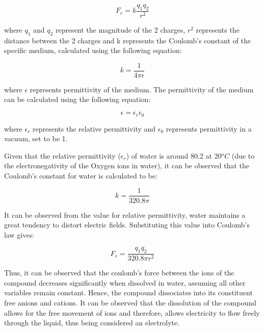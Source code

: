 \documentclass[11pt, a4]{article}
\begin{document}
			\begin{equation}
				F_{e} = k \frac{q_{1}q_{2}}{r^{2}}
			\end{equation}
				
				where $q_{1}$ and $q_{2}$ represent the magnitude of the 2 charges, $r^{2}$ represents the distance between the 2 charges and k represents the Coulomb's constant of the specific medium, calculated using the following equation:
				
			\begin{equation}
				k = \frac{1}{4 \pi \epsilon}
			\end{equation}
			
			where $\epsilon$ represents permittivity of the medium. The permittivity of the medium can be calculated using the following equation:
			
			\begin{equation}
				\epsilon = \epsilon _{r}\epsilon_{0}
			\end{equation}
			
			where $\epsilon _{r}$ represents the relative permittivity and $\epsilon _{0}$ represents permittivity in a vacuum, set to be 1.
			
			\bigbreak
			
			Given that the relative permittivity ($\epsilon _{r}$) of water is around 80.2 at 20$^{o}C$ (due to the electronegativity of the Oxygen ions in water), it can be observed that the Coulomb's constant for water is calculated to be:
			
			\begin{equation*}
				k = \frac{1}{320.8\pi}
			\end{equation*}
			
			It can be observed from the value for relative permittivity, water maintains a great tendency to distort electric fields. Substituting this value into Coulomb's law gives:
			
			\begin{equation*}
				F_{e} = \frac{q_{1}q_{2}}{320.8 \pi r^{2}}
			\end{equation*}

			
			Thus, it can be observed that the coulomb's force between the ions of the compound decreases significantly when dissolved in water, assuming all other variables remain constant. Hence, the compound dissociates into its constituent free anions and cations. It can be observed that the dissolution of the compound allows for the free movement of ions and therefore, allows electricity to flow freely through the liquid, thus being considered an electrolyte.
			 
\end{document}
